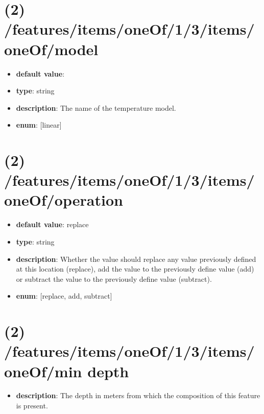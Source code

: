 \section{(2) /features/items/oneOf/1/3/items/oneOf/model}
\begin{itemize}[leftmargin=2em]\item {\bf default value}: 
\item {\bf type}: string
\item {\bf description}: The name of the temperature model.
\item {\bf enum}: [linear]\end{itemize}\section{(2) /features/items/oneOf/1/3/items/oneOf/operation}
\begin{itemize}[leftmargin=2em]\item {\bf default value}: replace
\item {\bf type}: string
\item {\bf description}: Whether the value should replace any value previously defined at this location (replace), add the value to the previously define value (add) or subtract the value to the previously define value (subtract).
\item {\bf enum}: [replace, add, subtract]\end{itemize}\section{(2) /features/items/oneOf/1/3/items/oneOf/min depth}
\begin{itemize}[leftmargin=2em]\item {\bf description}: The depth in meters from which the composition of this feature is present.
\end{itemize}
